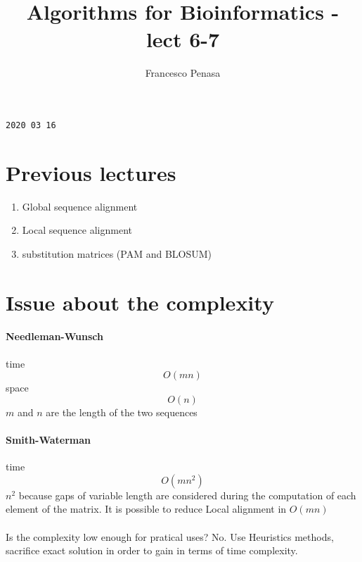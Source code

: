 \documentclass[11pt]{article}
\begin{document}
\author{Francesco Penasa}
\title{Algorithms for Bioinformatics - lect 6-7}
\maketitle

\medskip

\texttt{2020 03 16}
\section{Previous lectures} %
\label{sec:previous_lectures}
\begin{enumerate}
	\item Global sequence alignment
	\item Local sequence alignment	
	\item substitution matrices (PAM and BLOSUM)
\end{enumerate}

\section{Issue about the complexity} %
\label{sec:issue_about_the_complexity}
\paragraph{Needleman-Wunsch} %
\label{par:needleman_wunsch}
time
\[
	O(mn)
\]
space 
\[
	O(n)
\]
$m$ and $n$ are the length of the two sequences

\paragraph{Smith-Waterman} %
\label{par:smith_waterman}
time 
\[
	O(mn^2) 
\]
$n^2$ because gaps of variable length are considered during the computation of each element of the matrix. It is possible to reduce Local alignment in $O(mn)$

\paragraph{} %
\label{par:0}
Is the complexity low enough for pratical uses? No. Use Heuristics methods, sacrifice exact solution in order to gain in terms of time complexity.

\end{document}
